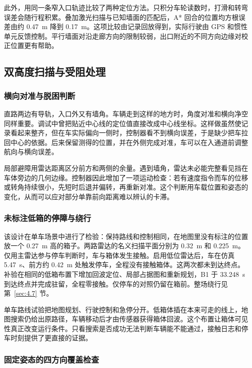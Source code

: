 此外，用同一条窄入口轨迹比较了两种定位方法。只积分车轮读数时，打滑和转弯误差会随行程积累。叠加激光扫描与已知墙面的匹配后，A* 回合的位置均方根误差由约 0.47~m 降到 0.17~m。这项比较由记录回放得到，实际行驶由 GPS 和惯性单元反馈控制。平行墙面对沿走廊方向的限制较弱，出口附近的不同方向边缘对校正位置更有帮助。

\subsection{双高度扫描与受阻处理}\label{sec:2.5}

\subsubsection*{横向对准与脱困判断}

直路两边有导轨，入口外又有墙角。车辆走到这样的地方时，角度对准和横向净空同样重要。调试中曾把贴近中心线的定位值直接改成中心线坐标。这样做虽然使记录看起来整齐，但在车实际偏向一侧时，控制器看不到横向误差，于是缺少把车拉回中心的依据。后来保留测得的位置，并在外侧完成对准，车可以在入通道前调整航向与横向误差。

局部避障用雷达距离区分前方和两侧的余量。遇到墙角，雷达未必能完整看见挡在车体旁边的几何边缘。控制器因此增加了一项运动检查：若有速度指令而车的位移或转角持续很小，先短时后退并偏转，再重新对准。这个判断用车载位置和姿态的变化，从而可以应对部分单靠前向距离难以辨认的卡滞。

\subsubsection*{未标注低箱的停障与绕行}

该设计在单车场景中进行了检验：保持路线和控制相同，在地图里没有标注的位置放一个 0.27~m 高的箱子。两路雷达的名义扫描平面分别为 0.32~m 和 0.225~m。仅用主雷达参与停车判断时，车与箱体发生接触。启用低位雷达后，车在仿真 5.47~s、前方约 0.42~m 处触发停车，全程没有接触箱体。这两次都未到达终点。补验在相同的低箱布置下增加回波定位、局部占据图和重新规划，B1 于 33.248~s 到达终点并完成驻留，全程零接触。仅停车的对照仍留在箱前。整场绕行见第~\ref{sec:4.7} 节。

单车路线试验把地图规划、行驶控制和急停分开。低箱体插在本来可走的线上，地图搜索仍给出原路径，车辆移动后才由传感器获得箱体回波。这个布置让箱体可见性真正改变运行条件。只看搜索是否成功无法判断车辆能不能通过，接触日志和停车时刻提供了更直接的证据。

\subsubsection*{固定姿态的四方向覆盖检查}

